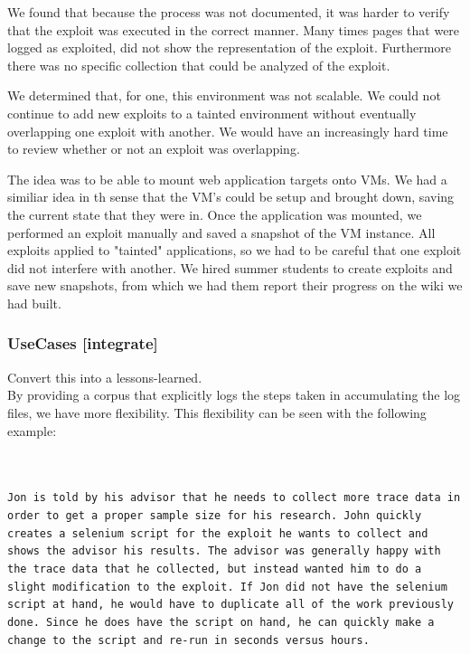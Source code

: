\documentclass[letterpaper,twocolumn,10pt]{article}
\begin{document}
We found that because the process was not documented, it was harder to verify that the exploit was executed in the correct manner.  Many times pages that were logged as exploited, did not show the representation of the exploit.  Furthermore there was no specific collection that could be analyzed of the exploit.\par

We determined that, for one, this environment was not scalable.  We could not continue to add new exploits to a tainted environment without eventually overlapping one exploit with another.  We would have an increasingly hard time to review whether or not an exploit was overlapping.\par

The idea was to be able to mount web application targets onto VMs.  We had a similiar idea in th sense that the VM's could be setup and brought down, saving the current state that they were in.  Once the application was mounted, we performed an exploit manually and saved a snapshot of the VM instance.  All exploits applied to "tainted" applications, so we had to be careful that one exploit did not interfere with another.  We hired summer students to create exploits and save new snapshots, from which we had them report their progress on the wiki we had built.\par

\subsubsection{UseCases [integrate]}
Convert this into a lessons-learned. \\

By providing a corpus that explicitly logs the steps taken in accumulating the log files, we have more flexibility.  This flexibility can be seen with the following example:  

\\\\
{\tt Jon is told by his advisor that he needs to collect more trace data in order to get a proper sample size for his research.  John quickly creates a selenium script for the exploit he wants to collect and shows the advisor his results.  The advisor was generally happy with the trace data that he collected, but instead wanted him to do a slight modification to the exploit.  If Jon did not have the selenium script at hand, he would have to duplicate all of the work previously done.  Since he does have the script on hand, he can quickly make a change to the script and re-run in seconds versus hours.}
\\\\
\end{document}
